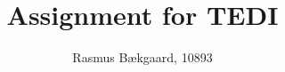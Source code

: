 





\usepackage[left=3cm,right=2cm,top=2.5cm,bottom=2cm]{geometry}

\linespread{1.5}

\title{Assignment for TEDI}
\author{Rasmus Bækgaard, 10893}